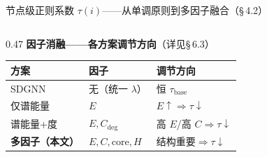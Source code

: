 \documentclass[aspectratio=169,9pt,xcolor=dvipsnames]{beamer}
\newcommand{\blue}[1]{\textcolor{mynavy}{#1}}
\begin{document}
\begin{frame}{节点级正则系数 $\tau(i)$——从单调原则到多因子融合（§\,4.2）}
\begin{columns}[T]
\begin{column}{0.47\textwidth}
  \vspace{0.15cm}
  \textbf{\blue{因子消融——各方案调节方向}}（详见§\,6.3）

  \vspace{0.15cm}
  \begin{tabular}{m{2cm}m{1.6cm}m{2.0cm}}
    \toprule
    \textbf{方案} & \textbf{因子} & \textbf{调节方向} \\
    \midrule
    SDGNN & 无（统一 $\lambda$） & 恒 $\tau_{\mathrm{base}}$ \\
    仅谱能量 & $E$ & $E\uparrow\Rightarrow\tau\downarrow$ \\
    谱能量+度 & $E,C_{\mathrm{deg}}$ & 高 $E$/高 $C\Rightarrow\tau\downarrow$ \\
    \textbf{多因子（本文）} & $E,C,\mathrm{core},H$ & 结构重要$\Rightarrow\tau\downarrow$ \\
    \bottomrule
  \end{tabular}

\end{column}

\end{columns}
\end{frame}
\end{document}
